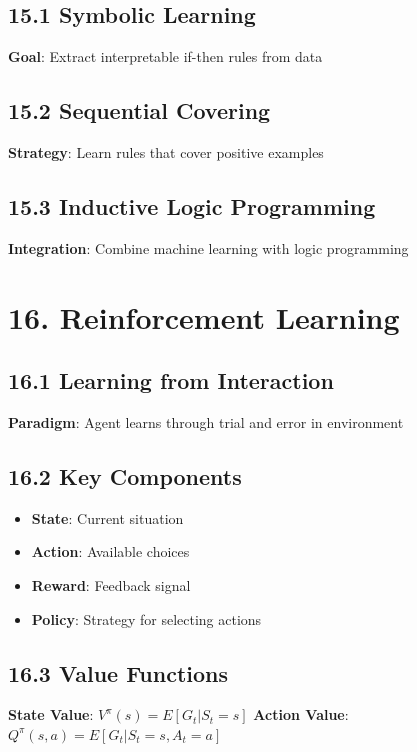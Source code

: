 \documentclass{amsart}
\theoremstyle{plain}
\theoremstyle{definition}
\theoremstyle{remark}
\begin{document}
\subsection{15.1 Symbolic Learning}

\textbf{Goal}: Extract interpretable if-then rules from data

\subsection{15.2 Sequential Covering}

\textbf{Strategy}: Learn rules that cover positive examples

\subsection{15.3 Inductive Logic Programming}

\textbf{Integration}: Combine machine learning with logic programming

\section{16. Reinforcement Learning}

\subsection{16.1 Learning from Interaction}

\textbf{Paradigm}: Agent learns through trial and error in environment

\subsection{16.2 Key Components}

\begin{itemize}
	\item \textbf{State}: Current situation
	\item \textbf{Action}: Available choices
	\item \textbf{Reward}: Feedback signal
	\item \textbf{Policy}: Strategy for selecting actions
\end{itemize}

\subsection{16.3 Value Functions}

\textbf{State Value}: $V^\pi(s) = E[G_t | S_t = s]$
\textbf{Action Value}: $Q^\pi(s,a) = E[G_t | S_t = s, A_t = a]$
\end{document}
